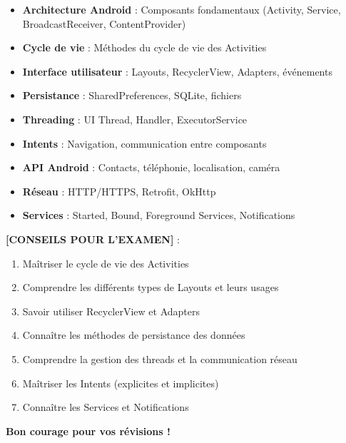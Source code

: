 \documentclass[11pt,a4paper]{article}
\begin{document}
\begin{itemize}
    \item \textbf{Architecture Android} : Composants fondamentaux (Activity, Service, BroadcastReceiver, ContentProvider)
    \item \textbf{Cycle de vie} : Méthodes du cycle de vie des Activities
    \item \textbf{Interface utilisateur} : Layouts, RecyclerView, Adapters, événements
    \item \textbf{Persistance} : SharedPreferences, SQLite, fichiers
    \item \textbf{Threading} : UI Thread, Handler, ExecutorService
    \item \textbf{Intents} : Navigation, communication entre composants
    \item \textbf{API Android} : Contacts, téléphonie, localisation, caméra
    \item \textbf{Réseau} : HTTP/HTTPS, Retrofit, OkHttp
    \item \textbf{Services} : Started, Bound, Foreground Services, Notifications
\end{itemize}

\textbf{[CONSEILS POUR L'EXAMEN]} :
\begin{enumerate}
    \item Maîtriser le cycle de vie des Activities
    \item Comprendre les différents types de Layouts et leurs usages
    \item Savoir utiliser RecyclerView et Adapters
    \item Connaître les méthodes de persistance des données
    \item Comprendre la gestion des threads et la communication réseau
    \item Maîtriser les Intents (explicites et implicites)
    \item Connaître les Services et Notifications
\end{enumerate}

\textbf{Bon courage pour vos révisions ! }
\end{document}
